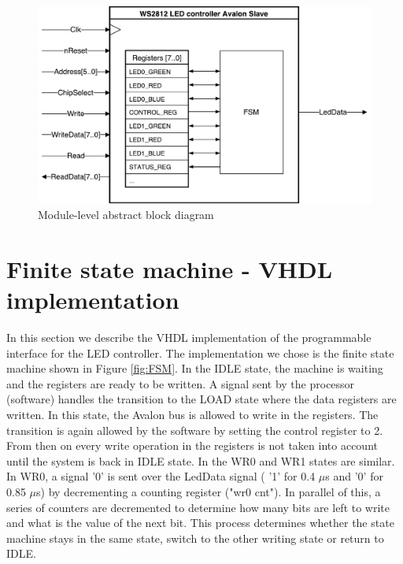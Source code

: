 \documentclass{article}
\begin{document}
\begin{figure}[H]
    \centering
    \includegraphics[width=\textwidth]{Led_periph_block_diagram}
    \caption{Module-level abstract block diagram}
    \label{fig:MLBD}
\end{figure}

\section{Finite state machine - VHDL implementation}
\label{sec:fsm}

In this section we describe the VHDL implementation of the programmable interface for the LED controller. 
The implementation we chose is the finite state machine shown in Figure \ref{fig:FSM}. 
In the IDLE state, the machine is waiting and the registers are ready to be written. 
A signal sent by the processor (software) handles the transition to the LOAD state where the data registers are written.
In this state, the Avalon bus is allowed to write in the registers.
The transition is again allowed by the software by setting the control register to 2.
From then on every write operation in the registers is not taken into account until the system is back in IDLE state.
In the WR0 and WR1 states are similar.
In WR0, a signal '0' is sent over the LedData signal ( '1' for 0.4 $\mu$s and '0' for 0.85 $\mu$s) by decrementing a counting register ("wr0 cnt"). In parallel of this, a series of counters are decremented to determine how many bits are left to write and what is the value of the next bit. This process determines whether the state machine stays in the same state, switch to the other writing state or return to IDLE.
\end{document}
